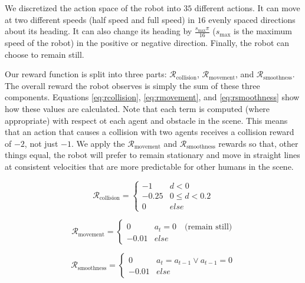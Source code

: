 \documentclass[letterpaper, 10 pt, conference]{ieeeconf}  %
\begin{document}
		We discretized the action space of the robot into $35$ different actions. It can move at two different speeds (half speed and full speed) in $16$ evenly spaced directions about its heading. It can also change its heading by $\frac{s_{\text{max}}\pi}{16}$ ($s_{\text{max}}$ is the maximum speed of the robot) in the positive or negative direction. Finally, the robot can choose to remain still.
		
		Our reward function is split into three parts: $\mathcal{R}_{\text{collision}}$, $\mathcal{R}_{\text{movement}}$, and $\mathcal{R}_{\text{smoothness}}$. The overall reward the robot observes is simply the sum of these three components. Equations \ref{eq:rcollision}, \ref{eq:rmovement}, and \ref{eq:rsmoothness} show how these values are calculated. Note that each term is computed (where appropriate) with respect ot each agent and obstacle in the scene. This means that an action that causes a collision with two agents receives a collision reward of $-2$, not just $-1$. We apply the $\mathcal{R}_{\text{movement}}$ and $\mathcal{R}_{\text{smoothness}}$ rewards so that, other things equal, the robot will prefer to remain stationary and move in straight lines at consistent velocities that are more predictable for other humans in the scene.
		
		\begin{equation}\label{eq:rcollision}
			\mathcal{R}_{\text{collision}} = \begin{cases}
				-1      &   d < 0\\
				-0.25   &   0 \leq d < 0.2\\
				0       &   else
			\end{cases}
		\end{equation}
		
		\begin{equation}\label{eq:rmovement}
			\mathcal{R}_{\text{movement}} = \begin{cases}
			0       &   a_t = 0 \quad\text{(remain still)}\\
			-0.01   &   else
			\end{cases}
		\end{equation}
		
		\begin{equation}\label{eq:rsmoothness}
			\mathcal{R}_{\text{smoothness}} = \begin{cases}
			0       &   a_t = a_{t-1} \vee a_{t-1} = 0\\
			-0.01   &   else
			\end{cases}
		\end{equation}
		
\end{document}
